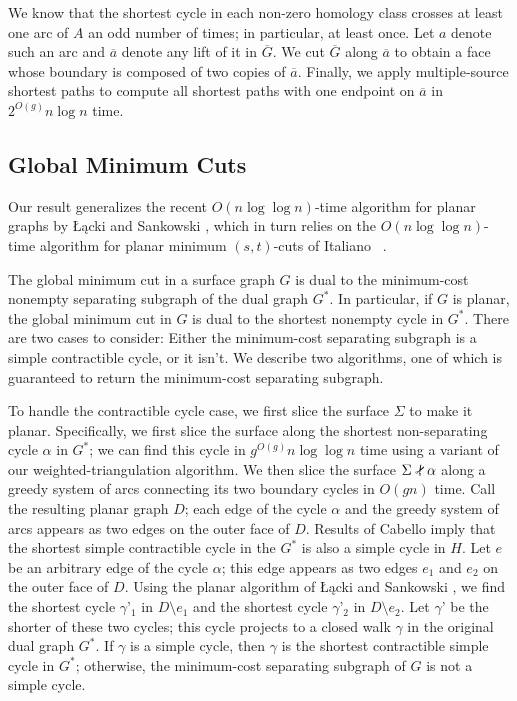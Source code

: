 \documentclass[natbib]{svcyclop}
\def\snip{\mathbin{\raisebox{0.15ex}{\rotatebox[origin=c]{60}{\Rightscissors}\!}}}
\def\snip{\mathbin{\raisebox{0.15ex}{\rotatebox[origin=c]{60}{\Rightscissors}\!}}}
\begin{document}
We know that the shortest cycle in each non-zero homology class crosses at least one arc of $A$ an odd number of times; in particular, at least once.
Let $a$ denote such an arc and $\overline{a}$ denote any lift of it in $\overline{G}$.  We cut $\overline{G}$ along $\overline{a}$ to obtain a face whose boundary is composed of two copies of $\overline{a}$.
Finally, we apply multiple-source shortest paths \cite{multishort} to compute all shortest paths with one endpoint on $\overline{a}$ in $2^{O(g)}n\log n$ time.

\subsection{Global Minimum Cuts}

Our result generalizes the recent $O(n\log \log n)$-time algorithm for planar graphs by Łącki and Sankowski \cite{ls-mcsc-11}, which in turn relies on the $O(n\log\log n)$-time algorithm for planar minimum $(s,t)$-cuts of Italiano \etal\ \cite{insw-iamcmf-11}.

The global minimum cut in a surface graph $G$ is dual to the minimum-cost nonempty separating subgraph of the dual graph $G^*$.  In particular, if $G$ is planar, the global minimum cut in $G$ is dual to the shortest nonempty cycle in $G^*$.
There are two cases to consider: Either the minimum-cost separating subgraph is a simple contractible cycle, or it isn’t.  We describe two algorithms, one of which is guaranteed to return the minimum-cost separating subgraph.


To handle the contractible cycle case, we first slice the surface $\Sigma$ to make it planar.  Specifically, we first slice the surface along the shortest non-separating cycle $\alpha$ in $G^*$; we can find this cycle in $g^{O(g)}n\log\log n$ time using a variant of our weighted-triangulation algorithm.  We then slice the surface $\Sigma\snip\alpha$  along a greedy system of arcs connecting its two boundary cycles in $O(gn)$ time.  Call the resulting planar graph $D$; each edge of the cycle $\alpha$ and the greedy system of arcs appears as two edges on the outer face of $D$.  Results of Cabello \cite{c-fscss-10} imply that the shortest simple contractible cycle in the  $G^*$ is also a simple cycle in $H$.  Let $e$ be an arbitrary edge of the cycle $\alpha$; this edge appears as two edges $e_1$ and $e_2$ on the outer face of $D$.  Using the planar algorithm of Łącki and Sankowski \cite{ls-mcsc-11}, we find the shortest cycle $\gamma’_1$ in  $D\setminus e_1$ and the shortest cycle $\gamma’_2$ in $D\setminus e_2$.  Let $\gamma’$ be the shorter of these two cycles; this cycle projects to a closed walk $\gamma$ in the original dual graph $G^*$.  If $\gamma$ is a simple cycle, then $\gamma$ is the shortest contractible simple cycle in $G^*$; otherwise,  the minimum-cost separating subgraph of $G$ is not a simple cycle.
\end{document}
